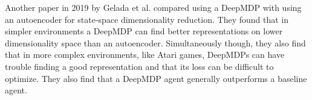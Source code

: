 Another paper in 2019 by Gelada et al. \cite{deepmdp} compared using a DeepMDP with using an autoencoder for state-space dimensionality reduction. They found that in simpler environments a DeepMDP can find better representations on lower dimensionality space than an autoencoder. Simultaneously though, they also find that in more complex environments, like Atari games, DeepMDPs can have trouble finding a good representation and that its loss can be difficult to optimize. They also find that a DeepMDP agent generally outperforms a baseline agent. 



